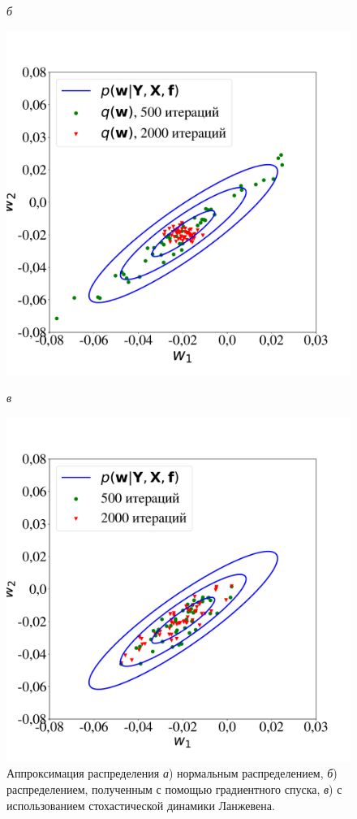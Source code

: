 \begin{example}
\begin{figure}[tbh!]
\endminipage\hfill
{}
\caption*{\textit{б}}
 
  \includegraphics[width=\linewidth]{./plots/var/sgd.pdf}
 \endminipage\hfill
{}%
 \caption*{\textit{в}}

  \includegraphics[width=\linewidth]{./plots/var/lang.pdf}
\endminipage\hfill
  \caption{Аппроксимация распределения \textit{а}) нормальным распределением, \textit{б}) распределением,
полученным с помощью градиентного спуска, \textit{в}) с использованием стохастической динамики Ланжевена.}
\label{fig:var}
\end{figure}





\end{example}
